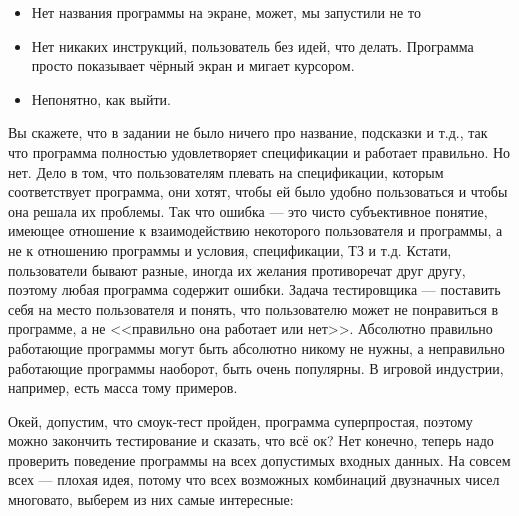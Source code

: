 \documentclass[a5paper]{article}
\begin{document}
\begin{itemize}
    \item Нет названия программы на экране, может, мы запустили не то
    \item Нет никаких инструкций, пользователь без идей, что делать. Программа просто показывает чёрный экран и мигает курсором.
    \item Непонятно, как выйти.
\end{itemize}

Вы скажете, что в задании не было ничего про название, подсказки и т.д., так что программа полностью удовлетворяет спецификации и работает правильно. Но нет. Дело в том, что пользователям плевать на спецификации, которым соответствует программа, они хотят, чтобы ей было удобно пользоваться и чтобы она решала их проблемы. Так что ошибка --- это чисто субъективное понятие, имеющее отношение к взаимодействию некоторого пользователя и программы, а не к отношению программы и условия, спецификации, ТЗ и т.д. Кстати, пользователи бывают разные, иногда их желания противоречат друг другу, поэтому любая программа содержит ошибки. Задача тестировщика --- поставить себя на место пользователя и понять, что пользователю может не понравиться в программе, а не <<правильно она работает или нет>>. Абсолютно правильно работающие программы могут быть абсолютно никому не нужны, а неправильно работающие программы наоборот, быть очень популярны. В игровой индустрии, например, есть масса тому примеров.

Окей, допустим, что смоук-тест пройден, программа суперпростая, поэтому можно закончить тестирование и сказать, что всё ок? Нет конечно, теперь надо проверить поведение программы на всех допустимых входных данных. На совсем всех --- плохая идея, потому что всех возможных комбинаций двузначных чисел многовато, выберем из них самые интересные:
\end{document}
